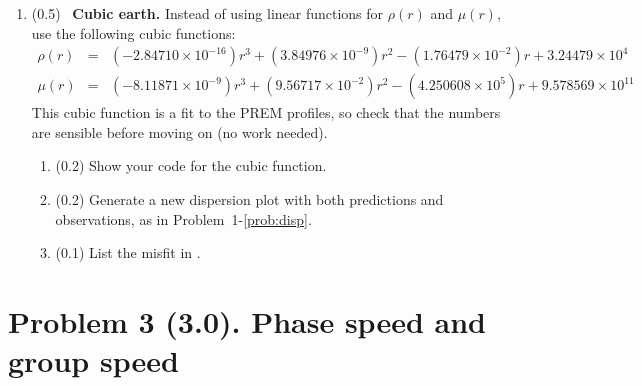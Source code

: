 \documentclass[11pt,titlepage,fleqn]{article}
\begin{document}
\begin{enumerate}
\item (0.5) \ptag\ {\bf Cubic earth.} Instead of using linear functions for $\rho(r)$ and $\mu(r)$, use the following cubic functions:
%
\begin{eqnarray*}
\rho(r) &=& (-2.84710 \times 10^{-16})r^3 + (3.84976 \times 10^{-9})r^2 - (1.76479 \times 10^{-2})r + 3.24479 \times 10^{4}
\\
\mu(r) &=& (-8.11871 \times 10^{-9}) r^3 + (9.56717 \times 10^{-2})r^2 - (4.250608 \times 10^{5})r + 9.578569 \times 10^{11}
\end{eqnarray*}
%
%
This cubic function is a fit to the PREM profiles, so check that the numbers are sensible before moving on (no work needed).

\begin{enumerate}
\item (0.2) Show your code for the cubic function.
\item (0.2) Generate a new dispersion plot with both predictions and observations, as in Problem~1-\ref{prob:disp}.
\item (0.1) List the misfit in .
\end{enumerate}

\label{prob:earth_cubic}

%


\end{enumerate}


\pagebreak
\section*{Problem 3 (3.0). Phase speed and group speed}
\end{document}
